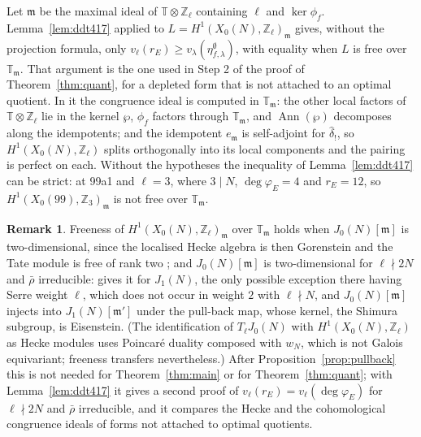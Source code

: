 \documentclass[11pt]{amsart}
\theoremstyle{definition}
\newtheorem{remark}[theorem]{Remark}
\newcommand{\Z}{\mathbb{Z}}
\newcommand{\T}{\mathbb{T}}
\newcommand{\degphi}{\deg\varphi_E}
\begin{document}
Let $\mathfrak m$ be the maximal ideal of $\T\otimes\Z_\ell$ containing $\ell$ and $\ker\phi_f$. Lemma~\ref{lem:ddt417} applied to $L=H^1(X_0(N),\Z_\ell)_{\mathfrak m}$ gives, without the projection formula, only $v_\ell(r_E)\ge v_\lambda(\eta^\emptyset_{f,\lambda})$, with equality when $L$ is free over $\T_{\mathfrak m}$. That argument is the one used in Step 2 of the proof of Theorem~\ref{thm:quant}, for a depleted form that is not attached to an optimal quotient. In it the congruence ideal is computed in $\T_{\mathfrak m}$: the other local factors of $\T\otimes\Z_\ell$ lie in the kernel $\wp$, $\phi_f$ factors through $\T_{\mathfrak m}$, and $\operatorname{Ann}(\wp)$ decomposes along the idempotents; and the idempotent $e_{\mathfrak m}$ is self-adjoint for $\hat\delta_!$, so $H^1(X_0(N),\Z_\ell)$ splits orthogonally into its local components and the pairing is perfect on each. Without the hypotheses the inequality of Lemma~\ref{lem:ddt417} can be strict: at 99a1 and $\ell=3$, where $3\mid N$, $\degphi=4$ and $r_E=12$, so $H^1(X_0(99),\Z_3)_{\mathfrak m}$ is not free over $\T_{\mathfrak m}$.

\begin{remark}\label{rem:free}
Freeness of $H^1(X_0(N),\Z_\ell)_{\mathfrak m}$ over $\T_{\mathfrak m}$ holds when $J_0(N)[\mathfrak m]$ is two-dimensional, since the localised Hecke algebra is then Gorenstein and the Tate module is free of rank two \cite{Tilouine97}; and $J_0(N)[\mathfrak m]$ is two-dimensional for $\ell\nmid2N$ and $\bar\rho$ irreducible: \cite[Theorem 3.5]{RibetStein} gives it for $J_1(N)$, the only possible exception there having Serre weight $\ell$, which does not occur in weight $2$ with $\ell\nmid N$, and $J_0(N)[\mathfrak m]$ injects into $J_1(N)[\mathfrak m']$ under the pull-back map, whose kernel, the Shimura subgroup, is Eisenstein. (The identification of $T_\ell J_0(N)$ with $H^1(X_0(N),\Z_\ell)$ as Hecke modules uses Poincar\'e duality composed with $w_N$, which is not Galois equivariant; freeness transfers nevertheless.) After Proposition~\ref{prop:pullback} this is not needed for Theorem~\ref{thm:main} or for Theorem~\ref{thm:quant}; with Lemma~\ref{lem:ddt417} it gives a second proof of $v_\ell(r_E)=v_\ell(\degphi)$ for $\ell\nmid2N$ and $\bar\rho$ irreducible, and it compares the Hecke and the cohomological congruence ideals of forms not attached to optimal quotients.
\end{remark}
\end{document}
